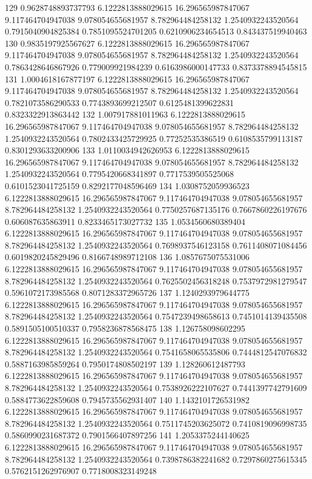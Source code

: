 {129 0.9628748893737793 6.1222813888029615 16.296565987847067 9.117464704947038 9.078054655681957 8.782964484258132 1.2540932243520564 0.7915040904825384 0.7851095524701205 0.6210906234654513 0.843437519940463
130 0.9835197925567627 6.1222813888029615 16.296565987847067 9.117464704947038 9.078054655681957 8.782964484258132 1.2540932243520564 0.7863428646867926 0.779009921984239 0.6163986000147733 0.8373378894545815
131 1.0004618167877197 6.1222813888029615 16.296565987847067 9.117464704947038 9.078054655681957 8.782964484258132 1.2540932243520564 0.7821073586290533 0.7743893699212507 0.6125481399622831 0.8323322913863442
132 1.007917881011963 6.1222813888029615 16.296565987847067 9.117464704947038 9.078054655681957 8.782964484258132 1.2540932243520564 0.7802433425729925 0.77252535386519 0.6108535799113187 0.8301293633200906
133 1.0110034942626953 6.1222813888029615 16.296565987847067 9.117464704947038 9.078054655681957 8.782964484258132 1.2540932243520564 0.7795420668341897 0.7717539505525068 0.6101523041725159 0.8292177048596469
134 1.0308752059936523 6.1222813888029615 16.296565987847067 9.117464704947038 9.078054655681957 8.782964484258132 1.2540932243520564 0.7750257687135176 0.7667860226197676 0.606087635863911 0.8233465173027732
135 1.0534560680389404 6.1222813888029615 16.296565987847067 9.117464704947038 9.078054655681957 8.782964484258132 1.2540932243520564 0.7698937546123158 0.7611408071084456 0.6019820245829496 0.8166748989712108
136 1.0857675075531006 6.1222813888029615 16.296565987847067 9.117464704947038 9.078054655681957 8.782964484258132 1.2540932243520564 0.7625502456318248 0.7537972981279547 0.5961072173985568 0.8071283372965726
137 1.1240293979644775 6.1222813888029615 16.296565987847067 9.117464704947038 9.078054655681957 8.782964484258132 1.2540932243520564 0.7547239498658613 0.7451014139435508 0.5891505100510337 0.7958236878568475
138 1.126758098602295 6.1222813888029615 16.296565987847067 9.117464704947038 9.078054655681957 8.782964484258132 1.2540932243520564 0.7541658065535806 0.7444812547076832 0.5887163985859264 0.7950174808502197
139 1.128260612487793 6.1222813888029615 16.296565987847067 9.117464704947038 9.078054655681957 8.782964484258132 1.2540932243520564 0.7538926222107627 0.7441397742791609 0.5884773622859608 0.7945735562931407
140 1.1432101726531982 6.1222813888029615 16.296565987847067 9.117464704947038 9.078054655681957 8.782964484258132 1.2540932243520564 0.7511745203625072 0.7410819096998735 0.5860990231687372 0.7901566407897256
141 1.2053375244140625 6.1222813888029615 16.296565987847067 9.117464704947038 9.078054655681957 8.782964484258132 1.2540932243520564 0.7398786382241682 0.7297860275615345 0.5762151262976907 0.7718008323149248
}

